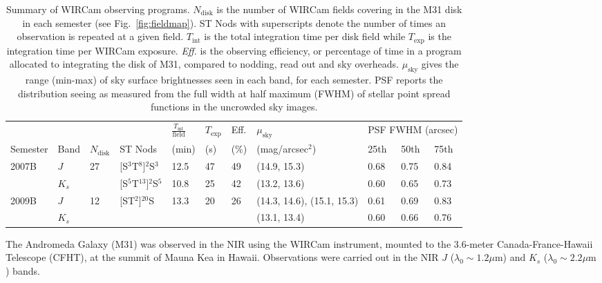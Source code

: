 \documentclass[iop]{emulateapj}
\newcommand{\Fig}[1]{Fig.~\ref{fig:#1}}  %
\begin{document}
\begin{table}[t]
\caption[Summary of WIRCam observing programs]{Summary of WIRCam observing programs.
$N_\mathrm{disk}$ is the number of WIRCam fields covering in the M31 disk in each semester (see \Fig{fieldmap}).
ST Nods with superscripts denote the number of times an observation is repeated at a given field.
$T_\mathrm{int}$ is the total integration time per disk field while $T_\mathrm{exp}$ is the integration time per WIRCam exposure.
\emph{Eff.} is the observing efficiency, or percentage of time in a program allocated to integrating the disk of M31, compared to nodding, read out and sky overheads.
$\mu_\mathrm{sky}$ gives the range (min-max) of sky surface brightnesses seen in each band, for each semester.
PSF reports the distribution seeing as measured from the full width at half maximum (FWHM) of stellar point spread functions in the uncrowded sky images.}
\label{tab:obssummary}
    
    \centering
    \begin{tabular}{lllllllllll}
        & & & & $\frac{T_\mathrm{int}}{\mathrm{field}}$ & $T_\mathrm{exp}$ & Eff. & $\mu_\mathrm{sky}$ & \multicolumn{3}{c}{PSF FWHM (arcsec)} \\ \cline{9-11}
    Semester & Band & $N_\mathrm{disk}$ & ST Nods & (min) &  (s) &  (\%) & (mag/arcsec$^2$) & 25th  & 50th & 75th \\
    \hline
    \multirow{2}{*}{2007B} & $J$ & \multirow{2}{*}{27} & [S$^3$T$^8$]$^{2}$S$^3$ & 12.5 & 47 & 49 & (14.9, 15.3) & 0.68 & 0.75 & 0.84 \\
     & $K_s$ &  & [S$^5$T$^{13}$]${^2}$S$^5$ & 10.8 & 25 & 42 & (13.2, 13.6) & 0.60 &  0.65 & 0.73 \\
     \hline
     \multirow{2}{*}{2009B} & $J$ & \multirow{2}{*}{12} & \multirow{2}{*}{[ST$^2$]$^{20}$S} & \multirow{2}{*}{13.3} & \multirow{2}{*}{20} & \multirow{2}{*}{26} & (14.3, 14.6), (15.1, 15.3) & 0.61 & 0.69 & 0.83 \\
      & $K_s$ & & & & & & (13.1, 13.4) & 0.60 & 0.66 & 0.76 \\
    \end{tabular}
\end{table}

The Andromeda Galaxy (M31) was observed in the NIR using the WIRCam instrument, mounted to the 3.6-meter Canada-France-Hawaii Telescope (CFHT), at the summit of Mauna Kea in Hawaii.
Observations were carried out in the NIR $J$ ($\lambda_0 \sim 1.2 \mu\mathrm{m}$) and $K_s$ ($\lambda_0 \sim 2.2 \mu\mathrm{m}$) bands.
\end{document}
